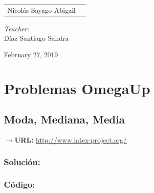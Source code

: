 \documentclass[12pt]{article}
\begin{document}
\begin{titlepage}
\begin{center}
\begin{minipage}{0.5\textwidth}
\begin{flushleft}
					\begin{tabular}{ll}
				     Nicolás Sayago Abigail\\

				\end{tabular}
				\end{flushleft}
			\end{minipage}%
			\begin{minipage}{0.5\textwidth}
				\begin{flushright} \large
					\emph{Teacher:} \\
					Díaz Santiago Sandra  \\
				\end{flushright}
			\end{minipage}
			
			\vfill
			
			{\large February 27, 2019}
		\end{center}
	\end{titlepage}
	
    \tableofcontents
    \newpage
    
    \section{Problemas OmegaUp}
         
          \subsection{Moda, Mediana, Media}
            $\rightarrow$\textbf{URL: }\url{http://www.latex-project.org/}
            
            \subsubsection{Solución:}
            
            \subsubsection{Código:}
                \inputminted{cpp}{Code/MMM.cpp}
                
\end{document}
